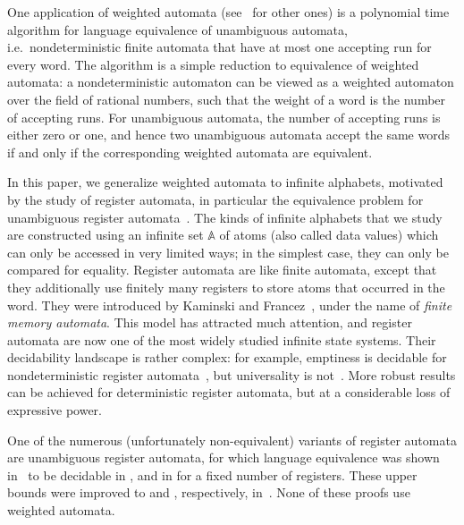 \documentclass[10pt,a4paper]{amsart}
\numberwithin{equation}{section}
\newcommand{\atoms}{\mathbb A}
\newcommand{\exptime}{{\sc{ExpTime}}\xspace }
\newcommand{\twoexpspace}{{\sc{2ExpSpace}}\xspace }
\newcommand{\twoexptime}{{\sc{2ExpTime}}\xspace }
\newcommand{\expspace}{{\sc{ExpSpace}}\xspace }
\begin{document}
One application of weighted automata (see~\cite{balle2015learning} for other ones) is a polynomial time algorithm for  language equivalence of unambiguous automata, i.e.~nondeterministic finite automata that have at most one accepting run for every  word. The algorithm is a simple reduction to equivalence of weighted automata:  a nondeterministic automaton can be viewed as a weighted automaton over the field of rational numbers, such that the weight of a  word is the number of accepting runs. For unambiguous automata, the number of accepting runs is either zero or one, and hence two unambiguous automata accept the same words if and only if the corresponding weighted automata are equivalent.

In this paper, we generalize weighted automata to infinite alphabets, motivated by the study of register automata, in particular the equivalence problem for unambiguous register automata~\cite{clementeUnamb2021, Colcombet15, MottetQ19Guessing, MottetQ19}.  The kinds of infinite alphabets that we study are constructed  using an infinite set $\atoms$ of atoms (also called data values) which can only be accessed in very limited ways; in the simplest case, they can only be compared for equality. Register automata are like finite  automata, except that they additionally use finitely many registers to store atoms that occurred in the  word.
They were introduced by Kaminski and Francez~\cite[Def.~1]{kaminskiFiniteMemoryAutomata1994}, under the name of \emph{finite memory automata}. This model has attracted much attention, and register automata are now one of the most widely studied  infinite state systems. Their decidability landscape is rather complex: for example, emptiness is decidable for nondeterministic register automata~\cite[Thm.~1]{kaminskiFiniteMemoryAutomata1994}, but universality is not~\cite[Thm~5.1]{nevenFiniteStateMachines2004}. More robust results can be achieved for deterministic register automata, but at a considerable loss of expressive power.

One of the numerous (unfortunately non-equivalent) variants of register automata are unambiguous register automata, for which  language equivalence was shown in~\cite[Thm.~1]{MottetQ19} to be  decidable in \twoexpspace, and in \expspace for a fixed number of registers. 
 These upper bounds were improved to \twoexptime and \exptime, respectively, in~\cite[Thm.~2]{clementeUnamb2021}. None of these proofs use weighted automata.
\end{document}
